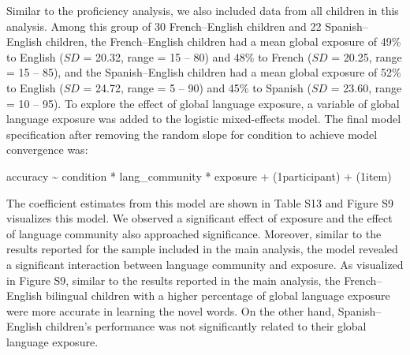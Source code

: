 \documentclass[
  man,floatsintext]{apa7}
\begin{document}
Similar to the proficiency analysis, we also included data from all children in this analysis. Among this group of 30 French--English children and 22 Spanish--English children, the French--English children had a mean global exposure of 49\% to English (\(SD\) = 20.32, range = 15 -- 80) and 48\% to French (\(SD\) = 20.25, range = 15 -- 85), and the Spanish--English children had a mean global exposure of 52\% to English (\(SD\) = 24.72, range = 5 -- 90) and 45\% to Spanish (\(SD\) = 23.60, range = 10 -- 95). To explore the effect of global language exposure, a variable of global language exposure was added to the logistic mixed-effects model. The final model specification after removing the random slope for condition to achieve model convergence was:

accuracy \textasciitilde{} condition * lang\_community * exposure + (1\textbar participant) + (1\textbar item)

\noindent The coefficient estimates from this model are shown in Table S13 and Figure S9 visualizes this model. We observed a significant effect of exposure and the effect of language community also approached significance. Moreover, similar to the results reported for the sample included in the main analysis, the model revealed a significant interaction between language community and exposure. As visualized in Figure S9, similar to the results reported in the main analysis, the French--English bilingual children with a higher percentage of global language exposure were more accurate in learning the novel words. On the other hand, Spanish--English children's performance was not significantly related to their global language exposure.
\end{document}
